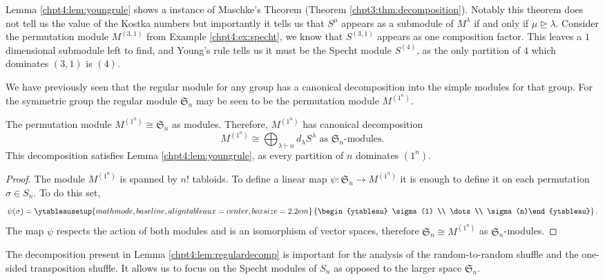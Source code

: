 \documentclass[11pt]{report}
\begin{document}
Lemma \ref{chpt4:lem:youngrule} shows a instance of Maschke's Theorem 
(Theorem \ref{chpt3:thm:decomposition}).
Notably this theorem does not tell us the value of the Kostka numbers but 
importantly it tells us that $S^{\mu}$ appears as a submodule of 
$M^{\lambda}$ if and only if $\mu \trianglerighteq \lambda$.
Consider the permutation module $M^{(3,1)}$ from Example \ref{chpt4:ex:specht}, we know that $S^{(3,1)}$ appears as one composition factor. This leaves a $1$ dimensional submodule left to find, and Young's rule tells us it must be the Specht module $S^{(4)}$, as the only partition of $4$ which dominates $(3,1)$ is $(4)$.

We have previously seen that 
the regular module for any group has a canonical decomposition into the simple modules for that group. For the symmetric group the regular module 
$\mathfrak{S}_{n}$ may be seen to be the permutation module $M^{(1^{n})}$. 

\begin{lemma}
	\label{chpt4:lem:regulardecomp}
	The permutation module $M^{(1^{n})} \cong \mathfrak{S}_{n}$ as modules. 
	Therefore, $M^{(1^{n})}$ has canonical decomposition
	\[M^{(1^{n})} \cong \bigoplus_{\lambda \vdash n} d_{\lambda} 
	S^{\lambda}  \text{ as $\mathfrak{S}_{n}$-modules}.\]
	This decomposition satisfies Lemma \ref{chpt4:lem:youngrule}, as every 
	partition of $n$ dominates $(1^{n})$.
\end{lemma}

\begin{proof}
	The module $M^{(1^{n})}$ is spanned by $n!$ tabloids. To define a linear map $\psi: 
	\mathfrak{S}_{n} \to M^{(1^{n})}$ it is enough to define it on each permutation $\sigma \in S_{n}$. To do this set,
	\[\psi(\sigma)  = 
	\ytableausetup{mathmode,baseline,aligntableaux=center,boxsize=2.2em}
	\left\lbrace \begin{ytableau} \sigma(1) \\ \dots  \\ 
	\sigma(n)\end{ytableau}
	\right\rbrace .\]
	The map $\psi$ respects the action of both modules and is an 
	isomorphism of vector spaces, therefore $\mathfrak{S}_{n} \cong 
	M^{(1^{n})}$ as $\mathfrak{S}_{n}$-modules.
\end{proof}


The decomposition present in Lemma \ref{chpt4:lem:regulardecomp} is 
important for the analysis of the random-to-random shuffle and the one-sided transposition shuffle. It allows us to focus on the Specht modules of $S_{n}$ as opposed to the larger space $\mathfrak{S}_{n}$. 
\end{document}
